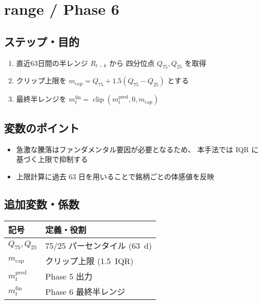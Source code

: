 
\section*{range / Phase 6}\nopagebreak[4]
\subsection*{ステップ・目的}
\begin{flushleft}
\begin{enumerate}
  \item 直近63日間の半レンジ \(R_{t-k}\) から
        四分位点 \(Q_{75}, Q_{25}\) を取得
  \item クリップ上限を
        \( m_{\text{cap}} = Q_{75} + 1.5(Q_{75}-Q_{25}) \) とする
  \item 最終半レンジを
        \( m_t^{\text{fin}} = \operatorname{clip}(m_t^{\text{pred}}, 0, m_{\text{cap}}) \)
\end{enumerate}
\end{flushleft}

\subsection*{変数のポイント}
\begin{flushleft}
\begin{itemize}
  \item 急激な騰落はファンダメンタル要因が必要となるため、
        本手法では IQR に基づく上限で抑制する
  \item 上限計算に過去 63 日を用いることで銘柄ごとの体感値を反映
\end{itemize}
\end{flushleft}

\subsection*{追加変数・係数}
\begin{flushleft}
\begin{minipage}{0.88\textwidth}
\begin{tabularx}{\textwidth}{@{}lX@{}}
\toprule
記号 & 定義・役割 \\
\midrule
\(Q_{75},Q_{25}\) & 75/25 パーセンタイル (63~d) \\
\(m_{\text{cap}}\) & クリップ上限 (1.5~IQR) \\
\(m_t^{\text{pred}}\) & Phase 5 出力 \\
\(m_t^{\text{fin}}\) & Phase 6 最終半レンジ \\
\bottomrule
\end{tabularx}
\end{minipage}
\end{flushleft}
